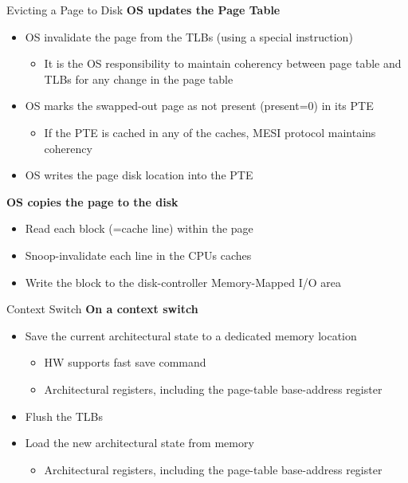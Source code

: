 \documentclass[aspectratio=169,12pt]{beamer}
\begin{document}
\begin{frame}{Evicting a Page to Disk}
\textbf{OS updates the Page Table}
\begin{itemize}
\item OS invalidate the page from the TLBs (using a special instruction)
    \begin{itemize}
    \item It is the OS responsibility to maintain coherency between page table and TLBs for any change in the page table
    \end{itemize}
\item OS marks the swapped-out page as not present (present=0) in its PTE
    \begin{itemize}
    \item If the PTE is cached in any of the caches, MESI protocol maintains coherency
    \end{itemize}
\item OS writes the page disk location into the PTE
\end{itemize}

\textbf{OS copies the page to the disk}
\begin{itemize}
\item Read each block (=cache line) within the page
\item Snoop-invalidate each line in the CPUs caches
\item Write the block to the disk-controller Memory-Mapped I/O area
\end{itemize}
\end{frame}

\begin{frame}{Context Switch}
\textbf{On a context switch}
\begin{itemize}
\item Save the current architectural state to a dedicated memory location
    \begin{itemize}
    \item HW supports fast save command
    \item Architectural registers, including the page-table base-address register
    \end{itemize}
\item Flush the TLBs
\item Load the new architectural state from memory
    \begin{itemize}
    \item Architectural registers, including the page-table base-address register
    \end{itemize}
\end{itemize}
\end{frame}
\end{document}
